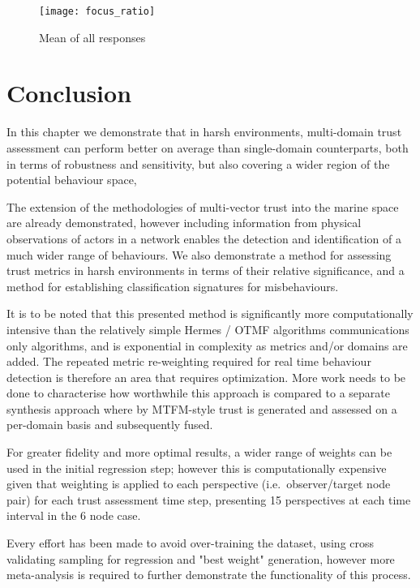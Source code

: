 \begin{figure}
	\centering
	\texttt{[image: focus\_ratio]}
	\caption{Mean of all responses}
	\label{fig:focus_ratio}
\end{figure}

\section{Conclusion}
In this chapter we demonstrate that in harsh environments, multi-domain trust assessment can perform better on average than single-domain counterparts, both in terms of robustness and sensitivity, but also covering a wider region of the potential behaviour space, 

The extension of the methodologies of multi-vector trust into the marine space are already demonstrated, however including information from physical observations of actors in a network enables the detection and identification of a much wider range of behaviours.
We also demonstrate a method for assessing trust metrics in harsh environments in terms of their relative significance, and a method for establishing classification signatures for misbehaviours.

It is to be noted that this presented method is significantly more computationally intensive than the relatively simple Hermes / OTMF algorithms communications only algorithms, and is exponential in complexity as metrics and/or domains are added. The repeated metric re-weighting required for real time behaviour detection is therefore an area that requires optimization. More work needs to be done to characterise how worthwhile this approach is compared to a separate synthesis approach where by MTFM-style trust is generated and assessed on a per-domain basis and subsequently fused.

For greater fidelity and more optimal results, a wider range of weights can be used in the initial regression step; however this is computationally expensive given that weighting is applied to each perspective (i.e.\ observer/target node pair) for each trust assessment time step, presenting 15 perspectives at each time interval in the 6 node case.

Every effort has been made to avoid over-training the dataset, using cross validating sampling for regression and "best weight" generation, however more meta-analysis is required to further demonstrate the functionality of this process.



